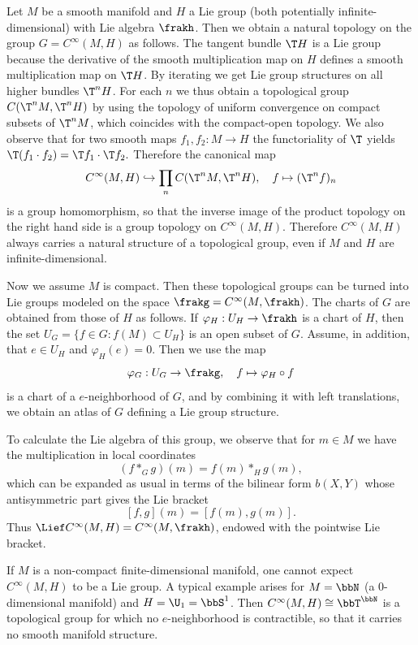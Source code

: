 \begin{example}
    Let $M$ be a smooth manifold and $H$ a Lie group (both potentially infinite-dimensional) with Lie algebra $\frakh$. Then we obtain a natural topology on the group $G=C^\infty(M,H)$ as follows. The tangent bundle $\T H$ is a Lie group because the derivative of the smooth  multiplication map on $H$ defines a smooth multiplication map on $\T H$. By iterating we get Lie group structures on all higher bundles $\T^n H$. For each $n$ we thus obtain a topological group $C(\T^nM,\T^nH)$ by using the topology of uniform convergence on compact subsets of $\T^nM$, which coincides with the compact-open topology. We also observe that for two smooth maps $f_1,f_2:M\to H$ the functoriality of $\T$ yields $\T(f_1\cdot f_2)=\T f_1\cdot \T f_2.$ Therefore the canonical map
    \[C^\infty(M,H)\hookrightarrow \prod_{n}C(\T^nM,\T^nH),\quad f\mapsto (\T^nf)_n\]
    is a group homomorphism, so that the inverse image of the product topology on the right hand side is a group topology on $C^\infty(M,H)$. Therefore $C^\infty(M,H)$ always carries a natural structure of a topological group, even if $M$ and $H$ are infinite-dimensional.

    Now we assume $M$ is compact. Then these topological groups can be turned into Lie groups modeled on the space $\frakg=C^\infty(M,\frakh)$. The charts of $G$ are obtained from those of $H$ as follows. If $\varphi_H:U_H\to \frakh$ is a chart of $H$, then the set $U_G=\{f\in G:f(M)\subset U_H\}$ is an open subset of $G$. Assume, in addition, that $e\in U_H$ and $\varphi_H(e)=0$. Then we use the map 
    \[\varphi_G:U_G\to\frakg,\quad f\mapsto \varphi_H\circ f\]
    is a chart of a $e$-neighborhood of $G$, and by combining it with left translations, we obtain an atlas of $G$ defining a Lie group structure.

    To calculate the Lie algebra of this group, we observe that for $m\in M$ we have the multiplication in local coordinates
    \[(f\ast_G g)(m)=f(m)\ast_H g(m),\]
    which can be expanded as usual in terms of the bilinear form $b(X,Y)$ whose antisymmetric part gives the Lie bracket
    \[[f,g](m)=[f(m),g(m)].\]
    Thus $\Lief C^\infty(M,H)=C^\infty(M,\frakh)$, endowed with the pointwise Lie bracket.
\end{example}

\begin{rem}
    If $M$ is a non-compact finite-dimensional manifold, one cannot expect $C^\infty(M,H)$ to be a Lie group. A typical example arises for $M=\bbN$ (a $0$-dimensional manifold) and $H=\U_1=\bbS^1$. Then $C^\infty(M,H)\cong \bbT^\bbN$ is a topological group for which no $e$-neighborhood is contractible, so that it carries no smooth manifold structure.
\end{rem}

